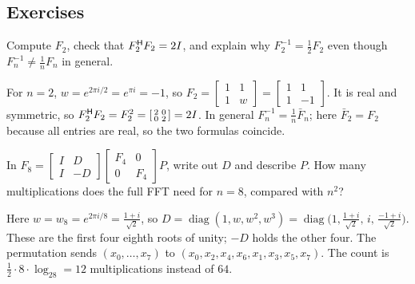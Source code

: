 \subsection{Exercises}

\begin{exercise}\label{exr:u30-f2}
Compute $F_2$, check that $F_2^{\mathsf{H}} F_2=2I$, and explain why $F_2^{-1}=\frac12F_2$ even though
$F_n^{-1}\ne\frac1nF_n$ in general.
\end{exercise}
\begin{solution}
For $n=2$, $w=e^{2\pi i/2}=e^{\pi i}=-1$, so $F_2=\left[\begin{smallmatrix}1&1\\1&w\end{smallmatrix}\right]
=\left[\begin{smallmatrix}1&1\\1&-1\end{smallmatrix}\right]$. It is real and symmetric, so
$F_2^{\mathsf{H}} F_2=F_2^2=\left[\begin{smallmatrix}2&0\\0&2\end{smallmatrix}\right]=2I$. In general
$F_n^{-1}=\frac1n\bar F_n$; here $\bar F_2=F_2$ because all entries are real, so the two formulas
coincide.
\end{solution}

\begin{exercise}[One step of the FFT for \texorpdfstring{$n=8$}{n = 8}]\label{exr:u30-f8}
In $F_8=\left[\begin{smallmatrix}I&D\\I&-D\end{smallmatrix}\right]\left[\begin{smallmatrix}F_4&0\\0&F_4\end{smallmatrix}\right]P$,
write out $D$ and describe $P$. How many multiplications does the full FFT need for $n=8$,
compared with $n^2$?
\end{exercise}
\begin{solution}
Here $w=w_8=e^{2\pi i/8}=\frac{1+i}{\sqrt2}$, so
$D=\operatorname{diag}(1,w,w^2,w^3)=\operatorname{diag}\bigl(1,\frac{1+i}{\sqrt2},\,i,\,\frac{-1+i}{\sqrt2}\bigr)$.
These are the first four eighth roots of unity; $-D$ holds the other four. The permutation sends
$(x_0,\dots,x_7)$ to $(x_0,x_2,x_4,x_6,x_1,x_3,x_5,x_7)$. The count is
$\tfrac12\cdot8\cdot\log_28=12$ multiplications instead of $64$.
\end{solution}

